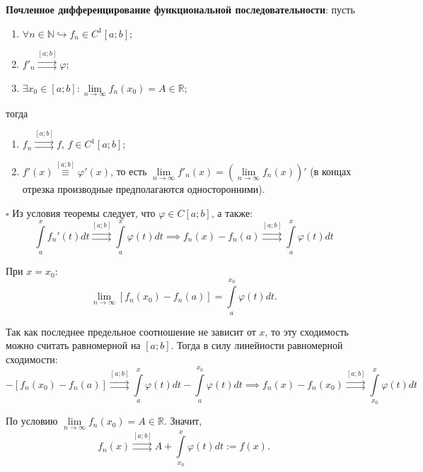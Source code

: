 \documentclass[12pt, a4paper, reqno]{article}
\begin{document}
    \textbf{Почленное дифференцирование функциональной последовательности}: пусть
    \begin{enumerate}
        \item $\forall n \in \mathbb{N} \hookrightarrow f_n \in C^1[a; b]$;
        \item $f'_n \overset{[a; b]}{\rightrightarrows} \varphi$;
        \item $\exists x_0 \in [a; b]: \lim\limits_{n \to \infty} f_n(x_0) = A \in \mathbb{R}$;
    \end{enumerate}
    тогда
    \begin{enumerate}
        \item $f_n \overset{[a; b]}{\rightrightarrows} f$, $f \in C^1[a; b]$;
        \item $f'(x) \overset{[a; b]}{\equiv} \varphi'(x)$, то есть
              $\lim\limits_{n \to \infty} f'_n(x) = \left(\lim\limits_{n \to \infty} f_n(x)\right)'$
              (в концах отрезка производные предполагаются односторонними).
    \end{enumerate}

    $\square$
    Из условия теоремы следует, что $\varphi \in C[a; b]$, а также:
    \begin{equation*}
        \int\limits_{a}^{x} f_n'(t)dt \overset{[a; b]}{\rightrightarrows} \int\limits_{a}^{x} \varphi(t)dt
        \implies f_n(x) - f_n(a) \overset{[a; b]}{\rightrightarrows} \int\limits_{a}^{x} \varphi(t)dt
    \end{equation*}

    При $x = x_0$:
    \begin{equation*}
        \lim\limits_{n \to \infty} [f_n(x_0) - f_n(a)] = \int\limits_{a}^{x_0} \varphi(t)dt.
    \end{equation*}

    Так как последнее предельное соотношение не зависит от $x$, то эту сходимость можно считать
    равномерной на $[a; b]$. Тогда в силу линейности равномерной сходимости:
    \begin{equation*}
        [f_n(x) - f_n(a)] - [f_n(x_0) - f_n(a)] \overset{[a; b]}{\rightrightarrows}
        \int\limits_{a}^{x} \varphi(t)dt - \int\limits_{a}^{x_0} \varphi(t)dt \implies
        f_n(x) - f_n(x_0) \overset{[a; b]}{\rightrightarrows} \int\limits_{x_0}^{x} \varphi(t)dt
    \end{equation*}

    По условию $\lim\limits_{n \to \infty} f_n(x_0) = A \in \mathbb{R}$. Значит,
    \begin{equation*}
        f_n(x) \overset{[a; b]}{\rightrightarrows} A + \int\limits_{x_0}^{x} \varphi(t)dt := f(x).
    \end{equation*}
\end{document}
